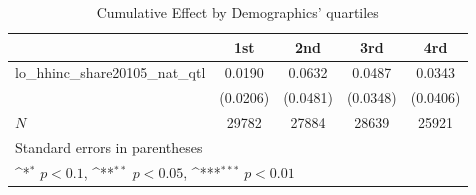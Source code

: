 \begin{table}[htbp]\centering
\def\sym#1{\ifmmode^{#1}\else\(^{#1}\)\fi}
\caption{Cumulative Effect by Demographics' quartiles}
\begin{tabular}{l*{4}{c}}
\hline\hline
            &\multicolumn{1}{c}{1st}&\multicolumn{1}{c}{2nd}&\multicolumn{1}{c}{3rd}&\multicolumn{1}{c}{4rd}\\
\hline
lo\_hhinc\_share20105\_nat\_qtl&      0.0190         &      0.0632         &      0.0487         &      0.0343         \\
            &    (0.0206)         &    (0.0481)         &    (0.0348)         &    (0.0406)         \\
\hline
\(N\)       &       29782         &       27884         &       28639         &       25921         \\
\hline\hline
\multicolumn{5}{l}{\footnotesize Standard errors in parentheses}\\
\multicolumn{5}{l}{\footnotesize \sym{*} \(p<0.1\), \sym{**} \(p<0.05\), \sym{***} \(p<0.01\)}\\
\end{tabular}
\end{table}
